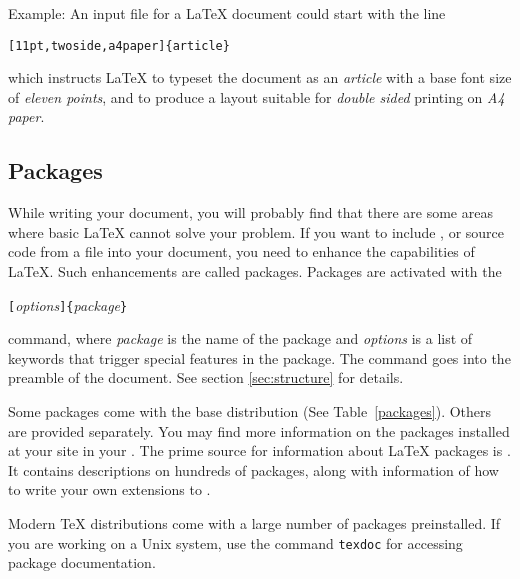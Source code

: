 Example: An input file for a \LaTeX{} document could start with the
line
\begin{code}
\verb|[11pt,twoside,a4paper]{article}|
\end{code}
which instructs \LaTeX{} to typeset the document as an \emph{article}
with a base font size of \emph{eleven points}, and to produce a
layout suitable for \emph{double sided} printing on \emph{A4 paper}.
\pagebreak[2]

\subsection{Packages}
 While writing your document, you will probably find
that there are some areas where basic \LaTeX{} cannot solve your
problem. If you want to include ,  or
source code from a file into your document, you need to enhance the
capabilities of \LaTeX.  Such enhancements are called packages.
Packages are activated with the
\begin{lscommand}
\verb|[|\emph{options}\verb|]{|\emph{package}\verb|}|
\end{lscommand}
\noindent command, where \emph{package} is the name of the package and
\emph{options} is a list of keywords that trigger special features in
the package. The  command goes into the preamble of the
document. See section \ref{sec:structure} for details.

Some packages come with the \LaTeXe{} base distribution
(See Table~\ref{packages}). Others are provided separately. You may
find more information on the packages installed at your site in your
\guide. The prime source for information about \LaTeX{} packages is \companion.
It contains descriptions on hundreds of packages, along with
information of how to write your own extensions to \LaTeXe.

Modern \TeX{} distributions come with a large number of packages
preinstalled. If you are working on a Unix system, use the command
\texttt{texdoc} for accessing package documentation.


